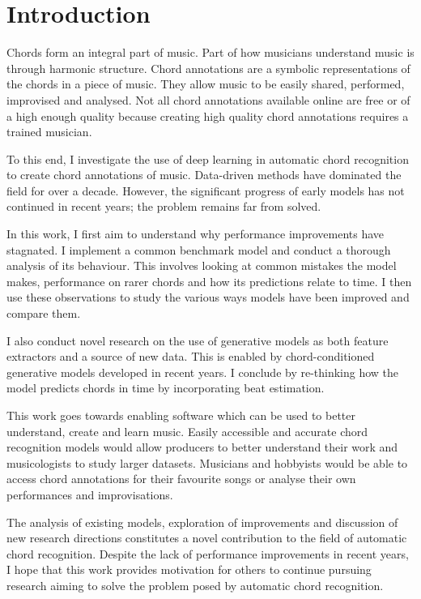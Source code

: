 \chapter{Introduction}

Chords form an integral part of music. Part of how musicians understand music is through harmonic structure. Chord annotations are a symbolic representations of the chords in a piece of music. They allow music to be easily shared, performed, improvised and analysed. Not all chord annotations available online are free or of a high enough quality because creating high quality chord annotations requires a trained musician. 

To this end, I investigate the use of deep learning in automatic chord recognition to create chord annotations of music. Data-driven methods have dominated the field for over a decade. However, the significant progress of early models has not continued in recent years; the problem remains far from solved.

In this work, I first aim to understand why performance improvements have stagnated. I implement a common benchmark model and conduct a thorough analysis of its behaviour. This involves looking at common mistakes the model makes, performance on rarer chords and how its predictions relate to time. I then use these observations to study the various ways models have been improved and compare them. 

I also conduct novel research on the use of generative models as both feature extractors and a source of new data. This is enabled by chord-conditioned generative models developed in recent years. I conclude by re-thinking how the model predicts chords in time by incorporating beat estimation. 

This work goes towards enabling software which can be used to better understand, create and learn music. Easily accessible and accurate chord recognition models would allow producers to better understand their work and musicologists to study larger datasets. Musicians and hobbyists would be able to access chord annotations for their favourite songs or analyse their own performances and improvisations.

The analysis of existing models, exploration of improvements and discussion of new research directions constitutes a novel contribution to the field of automatic chord recognition. Despite the lack of performance improvements in recent years, I hope that this work provides motivation for others to continue pursuing research aiming to solve the problem posed by automatic chord recognition. 

